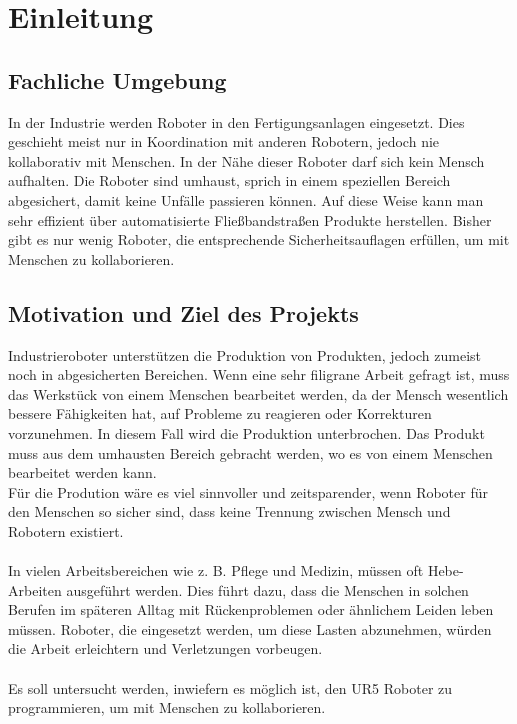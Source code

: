 \chapter{Einleitung}
\label{einleitung}

\section{Fachliche Umgebung}
\label{fachliche_domaene}

In der Industrie werden Roboter in den Fertigungsanlagen eingesetzt. 
Dies geschieht meist nur in Koordination mit anderen Robotern, jedoch nie kollaborativ mit Menschen. In der Nähe dieser Roboter darf sich kein Mensch aufhalten. Die Roboter sind umhaust, sprich in einem speziellen Bereich abgesichert, damit keine Unfälle passieren können. 
Auf diese Weise kann man sehr effizient über automatisierte Fließbandstraßen Produkte herstellen. 
Bisher gibt es nur wenig Roboter, die entsprechende Sicherheitsauflagen erfüllen, um mit Menschen zu kollaborieren.

\section{Motivation und Ziel des Projekts}
\label{projektziel_motivation}

Industrieroboter unterstützen die Produktion von Produkten, jedoch zumeist noch in abgesicherten Bereichen. Wenn eine sehr filigrane Arbeit gefragt ist, muss das Werkstück von einem Menschen bearbeitet werden, da der Mensch wesentlich bessere Fähigkeiten hat, auf Probleme zu reagieren oder Korrekturen vorzunehmen. In diesem Fall wird die Produktion unterbrochen. Das Produkt muss aus dem umhausten Bereich gebracht werden, wo es von einem Menschen bearbeitet werden kann.
\\
Für die Prodution wäre es viel sinnvoller und zeitsparender, wenn Roboter für den Menschen so sicher sind, dass keine Trennung zwischen Mensch und Robotern existiert.
\\\\
In vielen Arbeitsbereichen wie z. B. Pflege und Medizin, müssen oft Hebe-Arbeiten ausgeführt werden. Dies führt dazu, dass die Menschen in solchen Berufen im späteren Alltag mit Rückenproblemen oder ähnlichem Leiden leben müssen. Roboter, die eingesetzt werden, um diese Lasten abzunehmen, würden die Arbeit erleichtern und Verletzungen vorbeugen.
\\\\
Es soll untersucht werden, inwiefern es möglich ist, den UR5 Roboter zu programmieren, um mit Menschen zu kollaborieren.

